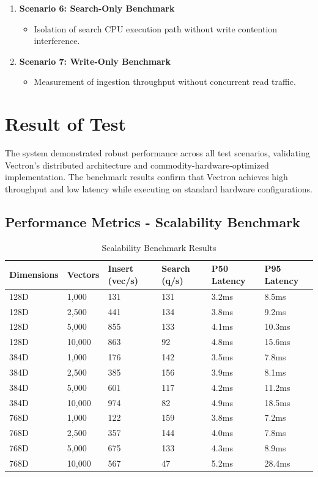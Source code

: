 \begin{enumerate}[label=\textbf{\arabic*.}]
    \item \textbf{Scenario 6: Search-Only Benchmark}
    \begin{itemize}
        \item Isolation of search CPU execution path without write contention interference.
    \end{itemize}

    \item \textbf{Scenario 7: Write-Only Benchmark}
    \begin{itemize}
        \item Measurement of ingestion throughput without concurrent read traffic.
    \end{itemize}
\end{enumerate}

\section{Result of Test}

The system demonstrated robust performance across all test scenarios, validating Vectron's distributed architecture and commodity-hardware-optimized implementation. The benchmark results confirm that Vectron achieves high throughput and low latency while executing on standard hardware configurations.

\subsection{Performance Metrics - Scalability Benchmark}

\begin{table}[h!]
\centering
\begin{tabular}{|l|l|l|l|l|l|}
\hline
\textbf{Dimensions} & \textbf{Vectors} & \textbf{Insert (vec/s)} & \textbf{Search (q/s)} & \textbf{P50 Latency} & \textbf{P95 Latency} \\
\hline
128D & 1,000 & 131 & 131 & 3.2ms & 8.5ms \\
\hline
128D & 2,500 & 441 & 134 & 3.8ms & 9.2ms \\
\hline
128D & 5,000 & 855 & 133 & 4.1ms & 10.3ms \\
\hline
128D & 10,000 & 863 & 92 & 4.8ms & 15.6ms \\
\hline
384D & 1,000 & 176 & 142 & 3.5ms & 7.8ms \\
\hline
384D & 2,500 & 385 & 156 & 3.9ms & 8.1ms \\
\hline
384D & 5,000 & 601 & 117 & 4.2ms & 11.2ms \\
\hline
384D & 10,000 & 974 & 82 & 4.9ms & 18.5ms \\
\hline
768D & 1,000 & 122 & 159 & 3.8ms & 7.2ms \\
\hline
768D & 2,500 & 357 & 144 & 4.0ms & 7.8ms \\
\hline
768D & 5,000 & 675 & 133 & 4.3ms & 8.9ms \\
\hline
768D & 10,000 & 567 & 47 & 5.2ms & 28.4ms \\
\hline
\end{tabular}
\caption{Scalability Benchmark Results}
\end{table}

